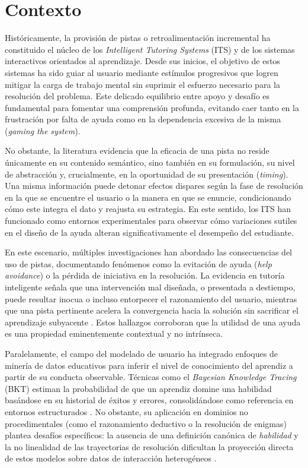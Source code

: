 \documentclass[../main.tex]{subfiles}
\begin{document}
\section{Contexto}
Históricamente, la provisión de pistas o retroalimentación incremental ha constituido el núcleo de los \textit{Intelligent Tutoring Systems} (ITS) y de los sistemas interactivos orientados al aprendizaje. Desde sus inicios, el objetivo de estos sistemas ha sido guiar al usuario mediante estímulos progresivos que logren mitigar la carga de trabajo mental sin suprimir el esfuerzo necesario para la resolución del problema. Este delicado equilibrio entre apoyo y desafío es fundamental para fomentar una comprensión profunda, evitando caer tanto en la frustración por falta de ayuda como en la dependencia excesiva de la misma (\textit{gaming the system}).

No obstante, la literatura evidencia que la eficacia de una pista no reside únicamente en su contenido semántico, sino también en su formulación, su nivel de abstracción y, crucialmente, en la oportunidad de su presentación (\textit{timing}). Una misma información puede detonar efectos dispares según la fase de resolución en la que se encuentre el usuario o la manera en que se enuncie, condicionando cómo este integra el dato y reajusta su estrategia. En este sentido, los ITS han funcionado como entornos experimentales para observar cómo variaciones sutiles en el diseño de la ayuda alteran significativamente el desempeño del estudiante.

En este escenario, múltiples investigaciones han abordado las consecuencias del uso de pistas, documentando fenómenos como la evitación de ayuda (\textit{help avoidance}) o la pérdida de iniciativa en la resolución. La evidencia en tutoría inteligente señala que una intervención mal diseñada, o presentada a destiempo, puede resultar inocua o incluso entorpecer el razonamiento del usuario, mientras que una pista pertinente acelera la convergencia hacia la solución sin sacrificar el aprendizaje subyacente \cite{Maniktala_2020}. Estos hallazgos corroboran que la utilidad de una ayuda es una propiedad eminentemente contextual y no intrínseca.

Paralelamente, el campo del modelado de usuario ha integrado enfoques de minería de datos educativos para inferir el nivel de conocimiento del aprendiz a partir de su conducta observable. Técnicas como el \textit{Bayesian Knowledge Tracing} (BKT) estiman la probabilidad de que un aprendiz domine una habilidad basándose en su historial de éxitos y errores, consolidándose como referencia en entornos estructurados \cite{BayesianKnowledgeTracing}. No obstante, su aplicación en dominios no procedimentales (como el razonamiento deductivo o la resolución de enigmas) plantea desafíos específicos: la ausencia de una definición canónica de \textit{habilidad} y la no linealidad de las trayectorias de resolución dificultan la proyección directa de estos modelos sobre datos de interacción heterogéneos \cite{ITSAdaptation}.
\end{document}
